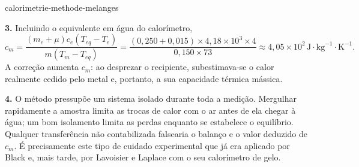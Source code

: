 \begin{exo}{calorimetrie-methode-melanges}
\begin{solution}
\textbf{3.} Incluindo o equivalente em água do calorímetro,
\[
c_m=\frac{(m_e+\mu)c_e(T_{eq}-T_e)}{m(T_m-T_{eq})}
=\frac{(0{,}250+0{,}015)\times4{,}18\times10^3\times4}{0{,}150\times73}
\approx4{,}05\times10^2\,\text{J}\!\cdot\!\text{kg}^{-1}\!\cdot\!\text{K}^{-1}.
\]
A correção aumenta $c_m$: ao desprezar o recipiente, subestimava-se o calor realmente cedido pelo metal e, portanto, a sua capacidade térmica mássica.

\textbf{4.} O método pressupõe um sistema isolado durante toda a medição. Mergulhar rapidamente a amostra limita as trocas de calor com o ar antes de ela chegar à água; um bom isolamento limita as perdas enquanto se estabelece o equilíbrio. Qualquer transferência não contabilizada falsearia o balanço e o valor deduzido de $c_m$. É precisamente este tipo de cuidado experimental que já era aplicado por Black e, mais tarde, por Lavoisier e Laplace com o seu calorímetro de gelo.
\end{solution}
\end{exo}

